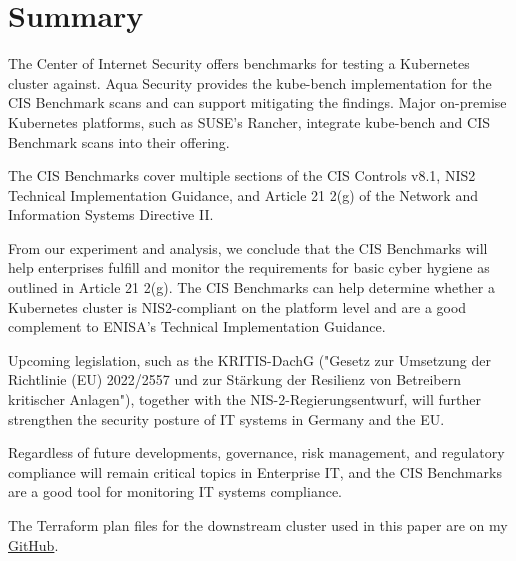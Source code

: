 %
%

\pagebreak
\section{Summary}

\onehalfspacing

The Center of Internet Security offers benchmarks for testing a Kubernetes cluster against. Aqua Security provides the kube-bench implementation for the CIS Benchmark scans and can support mitigating the findings. Major on-premise Kubernetes platforms, such as SUSE's Rancher, integrate kube-bench and CIS Benchmark scans into their offering.

The CIS Benchmarks cover multiple sections of the CIS Controls v8.1, NIS2 Technical Implementation Guidance, and Article 21 2(g) of the Network and Information Systems Directive II.

From our experiment and analysis, we conclude that the CIS Benchmarks will help enterprises fulfill and monitor the requirements for basic cyber hygiene as outlined in Article 21 2(g). The CIS Benchmarks can help determine whether a Kubernetes cluster is NIS2-compliant on the platform level and are a good complement to ENISA's Technical Implementation Guidance.

Upcoming legislation, such as the KRITIS-DachG ("Gesetz zur Umsetzung der Richtlinie (EU) 2022/2557 und zur Stärkung der Resilienz von Betreibern kritischer Anlagen"), together with the NIS-2-Regierungsentwurf, will further strengthen the security posture of IT systems in Germany and the EU.

Regardless of future developments, governance, risk management, and regulatory compliance will remain critical topics in Enterprise IT, and the CIS Benchmarks are a good tool for monitoring IT systems compliance.

The Terraform plan files for the downstream cluster used in this paper are on my \href{https://github.com/chfrank-cgn/Rancher}{GitHub}.
